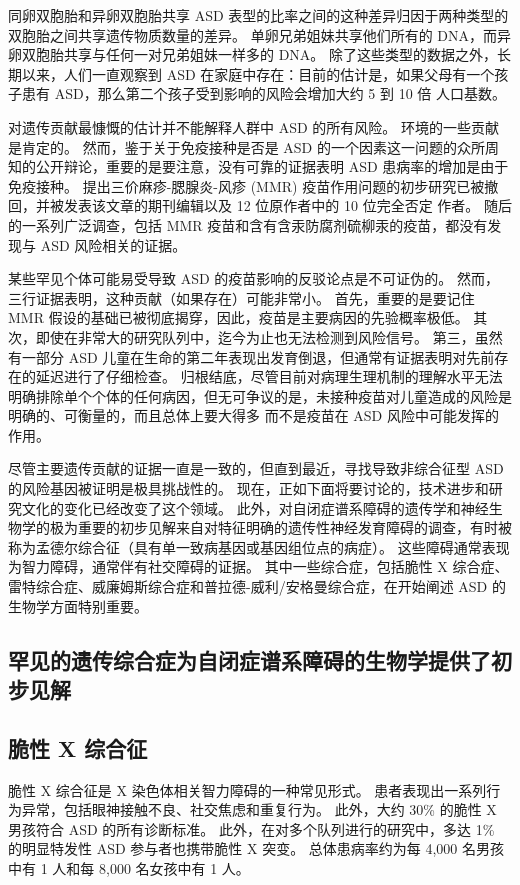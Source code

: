 同卵双胞胎和异卵双胞胎共享 ASD 表型的比率之间的这种差异归因于两种类型的双胞胎之间共享遗传物质数量的差异。 单卵兄弟姐妹共享他们所有的 DNA，而异卵双胞胎共享与任何一对兄弟姐妹一样多的 DNA。 除了这些类型的数据之外，长期以来，人们一直观察到 ASD 在家庭中存在：目前的估计是，如果父母有一个孩子患有 ASD，那么第二个孩子受到影响的风险会增加大约 5 到 10 倍 人口基数。

对遗传贡献最慷慨的估计并不能解释人群中 ASD 的所有风险。 环境的一些贡献是肯定的。 然而，鉴于关于免疫接种是否是 ASD 的一个因素这一问题的众所周知的公开辩论，重要的是要注意，没有可靠的证据表明 ASD 患病率的增加是由于免疫接种。 提出三价麻疹-腮腺炎-风疹 (MMR) 疫苗作用问题的初步研究已被撤回，并被发表该文章的期刊编辑以及 12 位原作者中的 10 位完全否定 作者。 随后的一系列广泛调查，包括 MMR 疫苗和含有含汞防腐剂硫柳汞的疫苗，都没有发现与 ASD 风险相关的证据。

某些罕见个体可能易受导致 ASD 的疫苗影响的反驳论点是不可证伪的。 然而，三行证据表明，这种贡献（如果存在）可能非常小。 首先，重要的是要记住 MMR 假设的基础已被彻底揭穿，因此，疫苗是主要病因的先验概率极低。 其次，即使在非常大的研究队列中，迄今为止也无法检测到风险信号。 第三，虽然有一部分 ASD 儿童在生命的第二年表现出发育倒退，但通常有证据表明对先前存在的延迟进行了仔细检查。 归根结底，尽管目前对病理生理机制的理解水平无法明确排除单个个体的任何病因，但无可争议的是，未接种疫苗对儿童造成的风险是明确的、可衡量的，而且总体上要大得多 而不是疫苗在 ASD 风险中可能发挥的作用。

尽管主要遗传贡献的证据一直是一致的，但直到最近，寻找导致非综合征型 ASD 的风险基因被证明是极具挑战性的。 现在，正如下面将要讨论的，技术进步和研究文化的变化已经改变了这个领域。 此外，对自闭症谱系障碍的遗传学和神经生物学的极为重要的初步见解来自对特征明确的遗传性神经发育障碍的调查，有时被称为孟德尔综合征（具有单一致病基因或基因组位点的病症）。 这些障碍通常表现为智力障碍，通常伴有社交障碍的证据。 其中一些综合症，包括脆性 X 综合症、雷特综合症、威廉姆斯综合症和普拉德-威利/安格曼综合症，在开始阐述 ASD 的生物学方面特别重要。


\subsection{罕见的遗传综合症为自闭症谱系障碍的生物学提供了初步见解}
\subsection{脆性 X 综合征}
脆性 X 综合征是 X 染色体相关智力障碍的一种常见形式。 患者表现出一系列行为异常，包括眼神接触不良、社交焦虑和重复行为。 此外，大约 30\% 的脆性 X 男孩符合 ASD 的所有诊断标准。 此外，在对多个队列进行的研究中，多达 1\% 的明显特发性 ASD 参与者也携带脆性 X 突变。 总体患病率约为每 4,000 名男孩中有 1 人和每 8,000 名女孩中有 1 人。

